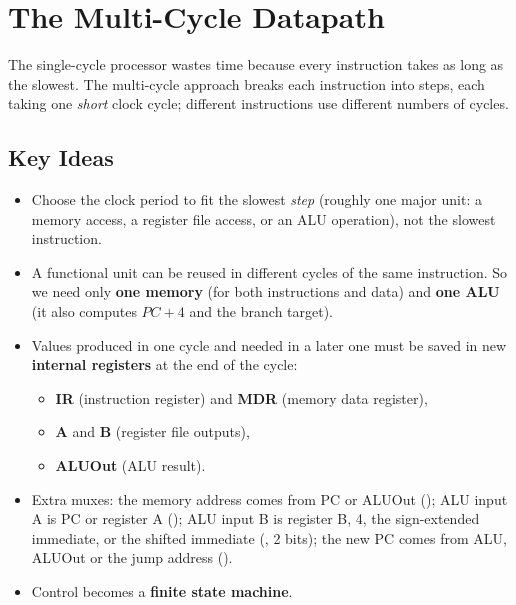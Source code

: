 \chapter{The Multi-Cycle Datapath}

The single-cycle processor wastes time because every instruction takes as
long as the slowest. The multi-cycle approach breaks each instruction into
steps, each taking one \emph{short} clock cycle; different instructions use
different numbers of cycles.

\section{Key Ideas}

\begin{itemize}
  \item Choose the clock period to fit the slowest \emph{step} (roughly one
    major unit: a memory access, a register file access, or an ALU
    operation), not the slowest instruction.
  \item A functional unit can be reused in different cycles of the same
    instruction. So we need only \textbf{one memory} (for both instructions
    and data) and \textbf{one ALU} (it also computes $PC+4$ and the branch
    target).
  \item Values produced in one cycle and needed in a later one must be
    saved in new \textbf{internal registers} at the end of the cycle:
    \begin{itemize}
      \item \textbf{IR} (instruction register) and \textbf{MDR} (memory data register),
      \item \textbf{A} and \textbf{B} (register file outputs),
      \item \textbf{ALUOut} (ALU result).
    \end{itemize}
  \item Extra muxes: the memory address comes from PC or ALUOut
    (); ALU input A is PC or register A (); ALU
    input B is register B, 4, the sign-extended immediate, or the shifted
    immediate (, 2 bits); the new PC comes from ALU, ALUOut or
    the jump address ().
  \item Control becomes a \textbf{finite state machine}.
\end{itemize}

